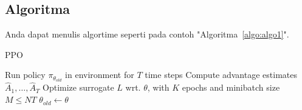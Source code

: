        
    \subsection{Algoritma}
    \label{subsec:algo}
    
    Anda dapat menulis algortime seperti pada contoh "Algoritma~\ref{algo:algo1}". 
    \begin{algorithm}
    	\caption{PPO} 
    	\label{algo:algo1}
    	\begin{algorithmic}[1]
    				\State Run policy $\pi_{\theta_{old}}$ in environment for $T$ time steps
    				\State Compute advantage estimates $\hat{A}_{1},\ldots,\hat{A}_{T}$
    			\EndFor
    			\State Optimize surrogate $L$ wrt. $\theta$, with $K$ epochs and minibatch size $M\leq NT$
    			\State $\theta_{old}\leftarrow\theta$
    		\EndFor
    	\end{algorithmic} 
    \end{algorithm}